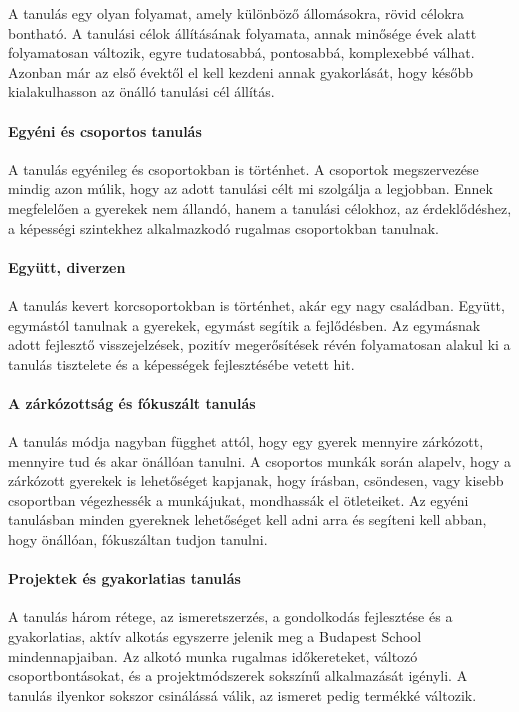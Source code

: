 A tanulás egy olyan folyamat, amely különböző állomásokra, rövid célokra
bontható. A tanulási célok állításának folyamata, annak minősége évek
alatt folyamatosan változik, egyre tudatosabbá, pontosabbá, komplexebbé
válhat. Azonban már az első évektől el kell kezdeni annak gyakorlását,
hogy később kialakulhasson az önálló tanulási cél állítás.



\paragraph{Egyéni és csoportos
      tanulás}

A tanulás egyénileg és csoportokban is történhet. A csoportok
megszervezése mindig azon múlik, hogy az adott tanulási célt mi
szolgálja a legjobban. Ennek megfelelően a gyerekek nem állandó, hanem a
tanulási célokhoz, az érdeklődéshez, a képességi szintekhez alkalmazkodó
rugalmas csoportokban tanulnak.


\paragraph{Együtt, diverzen}

A tanulás kevert korcsoportokban is történhet, akár egy nagy családban. Együtt,
egymástól tanulnak a gyerekek, egymást segítik a fejlődésben. Az egymásnak
adott fejlesztő visszejelzések, pozitív megerősítések révén folyamatosan alakul
ki a tanulás tisztelete és a képességek fejlesztésébe vetett hit.


\paragraph{A zárkózottság és fókuszált
      tanulás}

A tanulás módja nagyban függhet attól, hogy egy gyerek mennyire
zárkózott, mennyire tud és akar önállóan tanulni. A csoportos munkák
során alapelv, hogy a zárkózott gyerekek is lehetőséget kapjanak, hogy
írásban, csöndesen, vagy kisebb csoportban végezhessék a munkájukat,
mondhassák el ötleteiket. Az egyéni tanulásban minden gyereknek
lehetőséget kell adni arra és segíteni kell abban, hogy önállóan,
fókuszáltan tudjon tanulni.

\paragraph{Projektek és gyakorlatias tanulás}

A tanulás három rétege, az ismeretszerzés, a gondolkodás fejlesztése és
a gyakorlatias, aktív alkotás egyszerre jelenik meg a Budapest School
mindennapjaiban. Az alkotó munka rugalmas időkereteket, változó
csoportbontásokat, és a projektmódszerek sokszínű alkalmazását igényli.
A tanulás ilyenkor sokszor csinálássá válik, az ismeret pedig termékké
változik.


